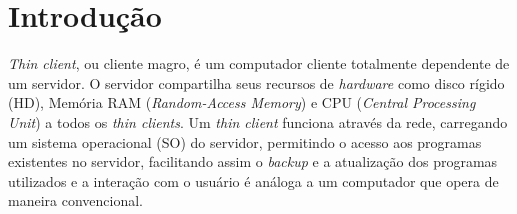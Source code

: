 \documentclass[
	12pt,				%
	openright,			%
	twoside,			%
	a4paper,			%
	chapter=TITLE,		%
	english,			%
	brazil				%
	]{abntex2}
\begin{document}








\textual




\chapter{Introdução}


\textit{Thin client}, ou cliente magro, é um computador cliente totalmente dependente de um servidor. O servidor compartilha seus recursos de \textit{hardware} como disco rígido (HD), Memória RAM (\textit{Random-Access Memory}) e CPU (\textit{Central Processing Unit}) a todos os \textit{thin clients}. Um \textit{thin client} funciona através da rede, carregando um sistema operacional (SO) do servidor, permitindo o acesso aos programas existentes no servidor, facilitando assim o \textit{backup} e a atualização dos programas utilizados e a interação com o usuário é análoga a um computador que opera de maneira convencional.
\end{document}
